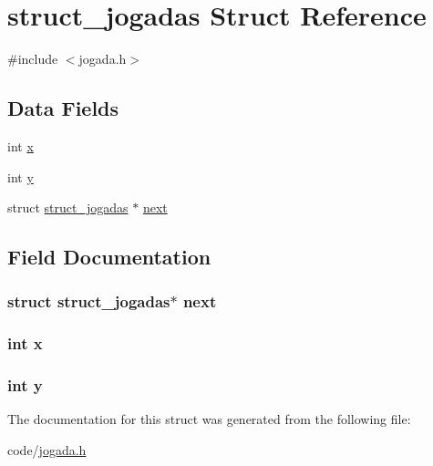 \hypertarget{structstruct__jogadas}{\section{struct\+\_\+jogadas Struct Reference}
\label{structstruct__jogadas}
}


{\ttfamily \#include $<$jogada.\+h$>$}

\subsection*{Data Fields}
\begin{DoxyCompactItemize}
\item 
int \hyperlink{structstruct__jogadas_a6150e0515f7202e2fb518f7206ed97dc}{x}
\item 
int \hyperlink{structstruct__jogadas_a0a2f84ed7838f07779ae24c5a9086d33}{y}
\item 
struct \hyperlink{structstruct__jogadas}{struct\+\_\+jogadas} $\ast$ \hyperlink{structstruct__jogadas_acbfb24b2c3a7f7d29678e55ccbee3948}{next}
\end{DoxyCompactItemize}


\subsection{Field Documentation}
\hypertarget{structstruct__jogadas_acbfb24b2c3a7f7d29678e55ccbee3948}{
\subsubsection[{next}]{\setlength{\rightskip}{0pt plus 5cm}struct {\bf struct\+\_\+jogadas}$\ast$ next}}\label{structstruct__jogadas_acbfb24b2c3a7f7d29678e55ccbee3948}
\hypertarget{structstruct__jogadas_a6150e0515f7202e2fb518f7206ed97dc}{
\subsubsection[{x}]{\setlength{\rightskip}{0pt plus 5cm}int x}}\label{structstruct__jogadas_a6150e0515f7202e2fb518f7206ed97dc}
\hypertarget{structstruct__jogadas_a0a2f84ed7838f07779ae24c5a9086d33}{
\subsubsection[{y}]{\setlength{\rightskip}{0pt plus 5cm}int y}}\label{structstruct__jogadas_a0a2f84ed7838f07779ae24c5a9086d33}


The documentation for this struct was generated from the following file\+:\begin{DoxyCompactItemize}
\item 
code/\hyperlink{jogada_8h}{jogada.\+h}\end{DoxyCompactItemize}
